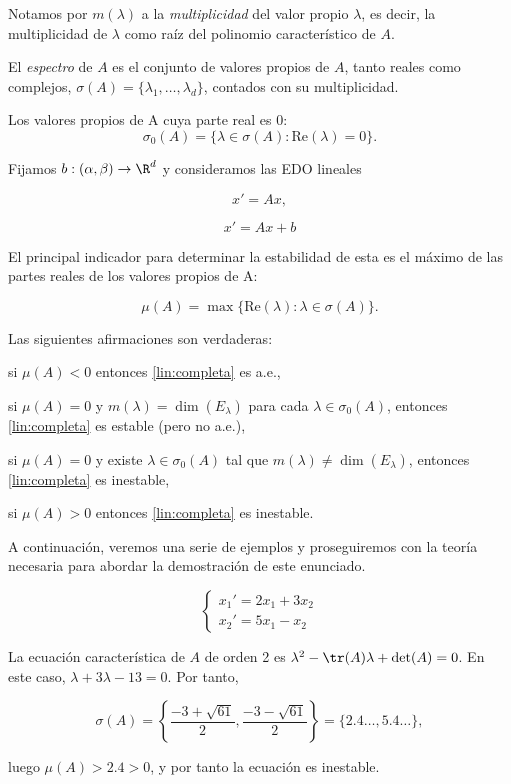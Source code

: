 \begin{notacion}
  Notamos por $m(\lambda)$ a la \emph{multiplicidad} del valor propio $\lambda$, es decir, la multiplicidad
  de $\lambda$ como raíz del polinomio característico de $A$.
\end{notacion}

\begin{notacion}[Espectro]
El \emph{espectro} de $A$ es el conjunto de valores propios de $A$, tanto reales como complejos, $\sigma(A)=\{\lambda_1,\dots,\lambda_d\}$, contados con su multiplicidad.
\end{notacion}

\begin{notacion}
Los valores propios de A cuya parte real es 0: \[ \sigma_0(A)=\{\lambda \in \sigma(A) : \mathrm{Re}(\lambda)=0\}. \]
\end{notacion}

Fijamos $b: (\alpha, \beta) \to \R^d$ y consideramos las EDO lineales

\[
  x' = Ax \label{lin:cons:thom} \tag{l.c.h.},
\]

\[
  x' = Ax + b \label{lin:cons:tcom} \tag{l.c.c.}
\]

El principal indicador para determinar la estabilidad de esta es el máximo de las partes reales de los valores propios de A:

\[ \mu(A)=\max\{\mathrm{Re}(\lambda) : \lambda\in\sigma(A)\}. \]

\begin{nth} Las siguientes afirmaciones son verdaderas: \label{lin:const:}
\begin{nlist}
\item si $\mu(A)<0$ entonces \ref{lin:completa} es a.e.,
\item si $\mu(A)=0$ y $m(\lambda)=\dim(E_\lambda)$ para cada $ \lambda \in \sigma_0(A)$, entonces \ref{lin:completa} es estable (pero no a.e.),
\item si $\mu(A)=0$ y existe $\lambda \in \sigma_0(A)$ tal que $m(\lambda) \ne \dim(E_\lambda)$, entonces \ref{lin:completa} es inestable,
\item si $\mu(A)>0$ entonces \ref{lin:completa} es inestable.
\end{nlist}
\end{nth}

A continuación, veremos una serie de ejemplos y proseguiremos con la teoría necesaria para abordar la demostración de este enunciado.


\begin{ejemplo}
\[
\left\{\begin{array}{lcl}
x_1'=2x_1+3x_2\\
x_2'=5x_1-x_2
\end{array}\right.
\]


La ecuación característica de $A$ de orden 2 es $\lambda^2-\tr(A)\lambda + \det(A) = 0$. En este caso,
$\lambda+3\lambda-13=0$. Por tanto,

\[ \sigma(A)=\left\{ \frac{-3+\sqrt{61}}{2},\frac{-3-\sqrt{61}}{2} \right\} = \{2.4\dots, 5.4\dots \}, \]

luego $\mu(A)>2.4 >0$, y por tanto la ecuación es inestable.
\end{ejemplo}

